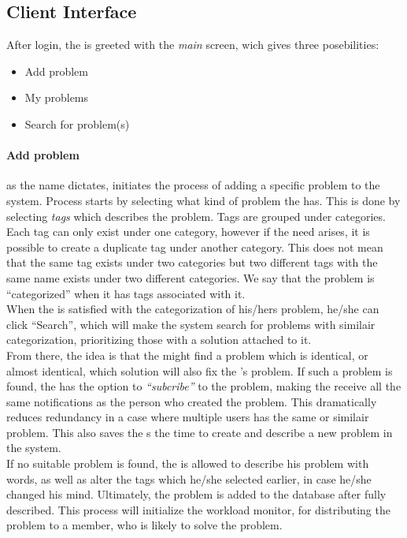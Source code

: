 \subsection{Client Interface}
\label{sec:client_interface}

After login, the \aclient[] is greeted with the \textit{main} screen, wich gives three posebilities:
\begin{itemize}
	\item Add problem
	\item My problems
	\item Search for problem(s)
\end{itemize}

\paragraph{Add problem} as the name dictates, initiates the process of adding a specific problem to the system. Process starts by selecting what kind of problem the \aclient[] has. This is done by selecting \textit{tags} which describes the problem. Tags are grouped under categories. Each tag can only exist under one category, however if the need arises, it is possible to create a duplicate tag under another category. This does not mean that the same tag exists under two categories but two different tags with the same name exists under two different categories. We say that the problem is ``categorized'' when it has tags associated with it.\\
When the \aclient[] is satisfied with the categorization of his/hers problem, he/she can click ``Search'', which will make the system search for problems with similair categorization, prioritizing those with a solution attached to it.\\
From there, the idea is that the \aclient[] might find a problem which is identical, or almost identical, which solution will also fix the \aclient 's problem. If such a problem is found, the \aclient[] has the option to \textit{``subcribe''} to the problem, making the \aclient[] receive all the same notifications as the person who created the problem. This dramatically reduces redundancy in a case where multiple users has the same or similair problem. This also saves the \aclient s the time to create and describe a new problem in the system.\\
If no suitable problem is found, the \aclient[] is allowed to describe his problem with words, as well as alter the tags which he/she selected earlier, in case he/she changed his mind. Ultimately, the problem is added to the database after fully described. This process will initialize the workload monitor, for distributing the problem to a \astaff[] member, who is likely to solve the problem.

